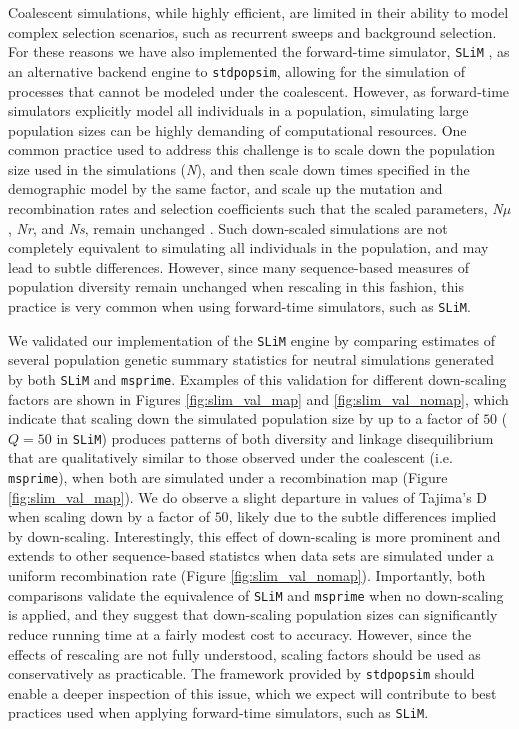 \documentclass[12pt,halfline,a4paper]{ouparticle}
\begin{document}
Coalescent simulations, while highly efficient, are limited in their ability to model
complex selection scenarios, such as recurrent sweeps and background selection. For these reasons
we have also implemented the forward-time simulator, \texttt{SLiM} \citep{haller2019tree,haller2019slim},
as an alternative backend engine to \texttt{stdpopsim}, allowing for the simulation of processes that cannot be modeled under
the coalescent. However, as forward-time simulators explicitly model all individuals in a population, simulating large
population sizes can be highly demanding of computational resources. One common practice used to address this challenge is to
scale down the population size used in the simulations (\textit{N}),
and then scale down times specified in the demographic model by the same factor, and scale up the mutation and recombination
rates and selection coefficients such that the scaled parameters, \textit{N$\mu$}, \textit{Nr},
and \textit{Ns}, remain unchanged \citep[see the \texttt{SLiM} manual and][]{uricchio2014robust}.
Such down-scaled simulations are not completely equivalent to simulating
all individuals in the population, and may lead to subtle differences.
However, since many sequence-based measures of population diversity remain unchanged when rescaling in this fashion,
this practice is very common when using forward-time simulators, such as \texttt{SLiM}.

We validated our implementation of the \texttt{SLiM} engine by comparing
estimates of several population genetic summary statistics for neutral simulations generated by both \texttt{SLiM}
and \texttt{msprime}.
Examples of this validation for different down-scaling factors are shown in
Figures \ref{fig:slim_val_map} and \ref{fig:slim_val_nomap}, which indicate that scaling down the simulated
population size by up to a factor
of $50$ ($Q=50$ in \texttt{SLiM}) produces patterns of both diversity and linkage disequilibrium that are
qualitatively similar to those observed under the coalescent (i.e. \texttt{msprime}), when both are simulated under a recombination map
(Figure \ref{fig:slim_val_map}).
We do observe a slight departure in values of Tajima's D when scaling down by a factor of $50$,
likely due to the subtle differences implied by down-scaling.
Interestingly, this effect of down-scaling is more prominent and extends to other sequence-based statistcs
when data sets are simulated under a uniform recombination rate (Figure \ref{fig:slim_val_nomap}).
Importantly, both comparisons validate the equivalence of \texttt{SLiM} and \texttt{msprime} when no down-scaling is applied,
and they suggest that down-scaling population sizes can significantly reduce running time at a fairly modest cost to accuracy.
However, since the effects of rescaling are not fully understood, scaling factors should be used as conservatively as practicable.
The framework provided by \texttt{stdpopsim} should enable a deeper inspection of this issue, which we expect will contribute to
best practices used when applying forward-time simulators, such as \texttt{SLiM}.
\end{document}
